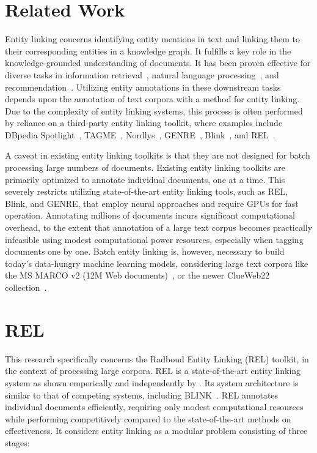 \section{Related Work}\label{sec:related-work}
Entity linking concerns identifying entity mentions in text and linking them to their corresponding entities in a knowledge graph. It fulfills a key role in the knowledge-grounded understanding of documents. It has been proven effective for diverse tasks in information retrieval~\citep{Gerritse:2020:GEER, Gerritse:2022:EMBERT, doc-ranking-entity, el-ranking-hasibi, el-balog, query-recommendation-entity, chatterjee2022bert}, natural language processing~\citep{lin-etal-2012-entity, watson}, and recommendation~\citep{yang-etal-2018-collective}.
Utilizing entity annotations in these downstream tasks depends upon the annotation of text corpora with a method for entity linking. Due to the complexity of entity linking systems, this process is often performed by reliance on a third-party entity linking toolkit, where examples include DBpedia Spotlight~\citep{dbpedia-spotlight}, TAGME~\citep{tagme}, Nordlys~\citep{nordlys}, GENRE~\citep{genre}, Blink~\citep{blink}, and REL~\citep{rel}.

A caveat in existing entity linking toolkits is that they are not designed for batch processing large numbers of documents. Existing entity linking toolkits are primarily optimized to annotate individual documents, one at a time. This severely restricts utilizing state-of-the-art entity linking tools, such as REL, Blink, and GENRE, that employ neural approaches and require GPUs for fast operation. Annotating millions of documents incurs significant computational overhead, to the extent that annotation of a large text corpus becomes practically infeasible using modest computational power resources, especially when tagging documents one by one. Batch entity linking is, however, necessary to build today's data-hungry machine learning models, considering large text corpora like the MS MARCO v2 (12M Web documents)~\citep{msmarco}, or the newer ClueWeb22 collection~\citep{clueweb22}.

\section{REL}
This research specifically concerns the Radboud Entity Linking (REL) toolkit, in the context of processing large corpora. REL is a state-of-the-art entity linking system as shown emperically and independently by \citet{bast-etal-2023-fair}. Its system architecture is similar to that of competing systems, including BLINK~\citep{blink}.
REL annotates individual documents efficiently, requiring only modest computational resources while performing competitively compared to the state-of-the-art methods on effectiveness. It considers entity linking as a modular problem consisting of three stages:

